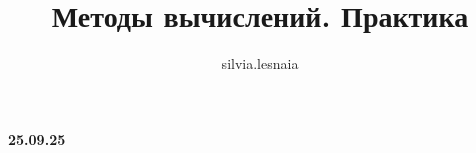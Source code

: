 \documentclass{article}
\title{Методы вычислений. Практика}
\author{silvia.lesnaia }
\begin{document}
\maketitle

\textbf{25.09.25}
\end{document}
